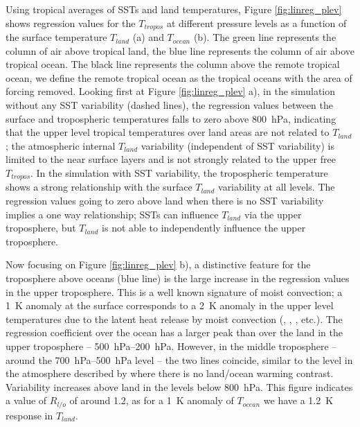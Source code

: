 Using tropical averages of SSTs and land temperatures, Figure 
\ref{fig:linreg_plev} shows regression values for the $T_{tropos}$ at different 
pressure levels as a function of the surface temperature $T_{land}$ (a) and 
$T_{ocean}$ (b). The green line represents the column of air above tropical 
land, the blue line represents the column of air above tropical ocean. The black 
line represents the column above the remote tropical ocean, we define the remote 
tropical ocean as the tropical oceans with the area of forcing removed.  Looking 
first at Figure \ref{fig:linreg_plev} a), in the simulation without any SST 
variability (dashed lines), the regression values between the surface and 
tropospheric temperatures falls to zero above \SI{800}{\hecto\pascal}, 
indicating that the upper level tropical temperatures over land areas are not 
related to $T_{land}$; the atmospheric internal $T_{land}$ variability 
(independent of SST variability) is limited to the near surface layers and is 
not strongly related to the upper free $T_{tropos}$. In the simulation with SST 
variability, the tropospheric temperature shows a strong relationship with the 
surface $T_{land}$ variability at all levels. The regression values going to 
zero above land when there is no SST variability implies a one way relationship; 
SSTs can influence $T_{land}$ via the upper troposphere, but $T_{land}$ is not 
able to independently influence the upper troposphere.

Now focusing on Figure \ref{fig:linreg_plev} b), a distinctive feature for the 
troposphere above oceans (blue line) is the large increase in the regression 
values in the upper troposphere. This is a well known signature of moist
convection; a \SI{1}{\kelvin} anomaly at the surface corresponds to a 
\SI{2}{\kelvin} anomaly in the upper level temperatures due to the latent heat 
release by moist convection (\citet{Joshi2007}, \citet{Byrne2013}, 
\citet{Dommenget2009}, etc.). The regression coefficient over the ocean has a 
larger peak than over the land in the upper troposphere --  
\SIrange{500}{200}{\hecto\pascal}.  However, in the middle troposphere -- around 
the \SIrange{700}{500}{\hecto\pascal} level -- the two lines coincide, similar 
to the level in the atmosphere described by \citet{Joshi2007} where there is no 
land/ocean warming contrast. Variability increases above land in the levels 
below \SI{800}{\hecto\pascal}.  This figure indicates a value of $R_{l/o}$ of 
around 1.2, as for a \SI{1}{\kelvin} anomaly of $T_{ocean}$ we have a 
\SI{1.2}{\kelvin} response in $T_{land}$.  

